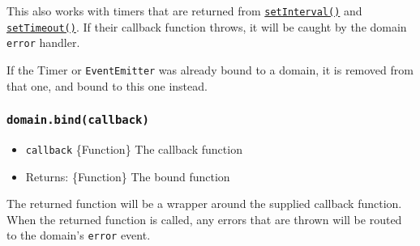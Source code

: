 This also works with timers that are returned from
\href{timers.md\#setintervalcallback-delay-args}{\texttt{setInterval()}}
and
\href{timers.md\#settimeoutcallback-delay-args}{\texttt{setTimeout()}}.
If their callback function throws, it will be caught by the domain
\texttt{\textquotesingle{}error\textquotesingle{}} handler.

If the Timer or \texttt{EventEmitter} was already bound to a domain, it
is removed from that one, and bound to this one instead.

\subsubsection{\texorpdfstring{\texttt{domain.bind(callback)}}{domain.bind(callback)}}\label{domain.bindcallback}

\begin{itemize}
\tightlist
\item
  \texttt{callback} \{Function\} The callback function
\item
  Returns: \{Function\} The bound function
\end{itemize}

The returned function will be a wrapper around the supplied callback
function. When the returned function is called, any errors that are
thrown will be routed to the domain's
\texttt{\textquotesingle{}error\textquotesingle{}} event.

\begin{Shaded}
\begin{Highlighting}[]
\OperatorTok{=}\NormalTok{()}\OperatorTok{;}

 \OperatorTok{,}
\OperatorTok{,} \OperatorTok{,}\OperatorTok{,}\KeywordTok{=\textgreater{}}\NormalTok{ \{}
     \OperatorTok{,} \OperatorTok{:} \NormalTok{)}\OperatorTok{;}
\NormalTok{  \}))}\OperatorTok{;}
\NormalTok{\}}

\NormalTok{(}\OperatorTok{,}\KeywordTok{=\textgreater{}}\NormalTok{ \{}
\NormalTok{\})}\OperatorTok{;}
\end{Highlighting}
\end{Shaded}

